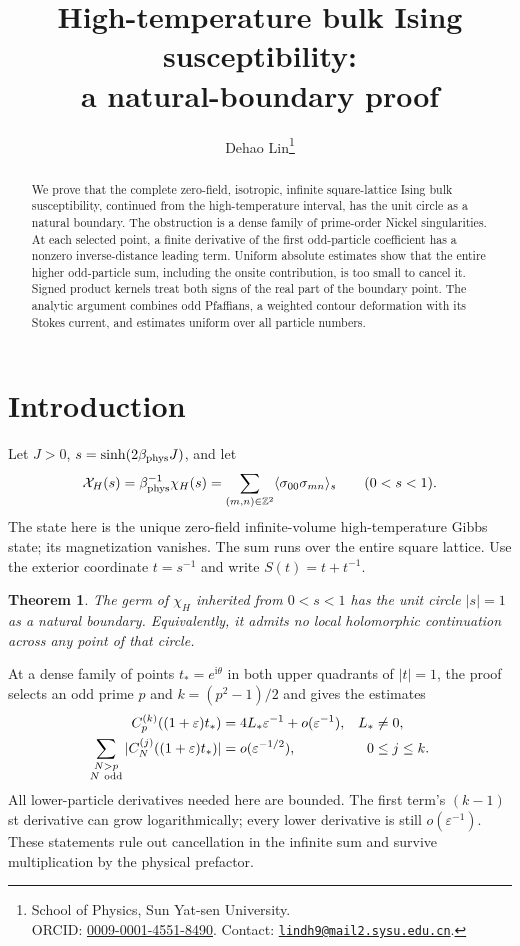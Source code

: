 \documentclass[11pt]{article}
\title{High-temperature bulk Ising susceptibility:\\a natural-boundary proof}
\author{Dehao Lin\thanks{\raggedright School of Physics, Sun Yat-sen University.\\ORCID: \href{https://orcid.org/0009-0001-4551-8490}{0009-0001-4551-8490}. Contact: \href{mailto:lindh9@mail2.sysu.edu.cn}{\texttt{lindh9@mail2.sysu.edu.cn}}.}}
\date{}
\numberwithin{equation}{section}
\newtheorem{theorem}{Theorem}[section]
\theoremstyle{definition}
\newcommand{\ii}{\mathrm i}
\newcommand{\Z}{\mathbb Z}
\newcommand{\eps}{\varepsilon}
\begin{document}
\maketitle
\begin{abstract}
We prove that the complete zero-field, isotropic, infinite square-lattice
Ising bulk susceptibility, continued from the high-temperature interval,
has the unit circle as a natural boundary. The obstruction is a dense
family of prime-order Nickel singularities. At each selected point, a
finite derivative of the first odd-particle coefficient has a nonzero
inverse-distance leading term. Uniform absolute estimates show that the
entire higher odd-particle sum, including the onsite contribution, is too
small to cancel it. Signed product kernels treat both signs of the real
part of the boundary point. The analytic argument combines odd Pfaffians,
a weighted contour deformation with its Stokes current, and estimates
uniform over all particle numbers.
\end{abstract}

\section{Introduction}\label{sec:scope}
Let $J>0$, $s=\sinh(2\beta_{\rm phys}J)$, and let
\[
 \mathcal X_H(s)=\beta_{\rm phys}^{-1}\chi_H(s)
 =\sum_{(m,n)\in\Z^2}\langle\sigma_{00}\sigma_{mn}\rangle_s
 \qquad(0<s<1).
\]
The state here is the unique zero-field infinite-volume high-temperature
Gibbs state; its magnetization vanishes. The sum runs over the entire
square lattice. Use the exterior coordinate $t=s^{-1}$ and write
$S(t)=t+t^{-1}$.

\begin{theorem}\label{thm:main}
The germ of $\chi_H$ inherited from $0<s<1$ has the unit circle
$|s|=1$ as a natural boundary. Equivalently, it admits no local
holomorphic continuation across any point of that circle.
\end{theorem}

At a dense family of points $t_*=e^{\ii\theta}$ in both upper
quadrants of $|t|=1$, the proof selects an odd prime $p$ and
$k=(p^2-1)/2$ and gives the estimates
\begin{align}
 C_p^{(k)}((1+\eps)t_*)&=4L_*\eps^{-1}+o(\eps^{-1}),
       &L_*&\ne0,\label{eq:roadmapfirst}\\
 \sum_{\substack{N>p\\N\ {\rm odd}}}
 |C_N^{(j)}((1+\eps)t_*)|&=o(\eps^{-1/2}),
       &0&\le j\le k.\label{eq:roadmaptail}
\end{align}
All lower-particle derivatives needed here are bounded. The first term's
$(k-1)$st derivative can grow logarithmically; every lower derivative
is still $o(\eps^{-1})$. These statements rule out cancellation in the
infinite sum and survive multiplication by the physical prefactor.
\end{document}
